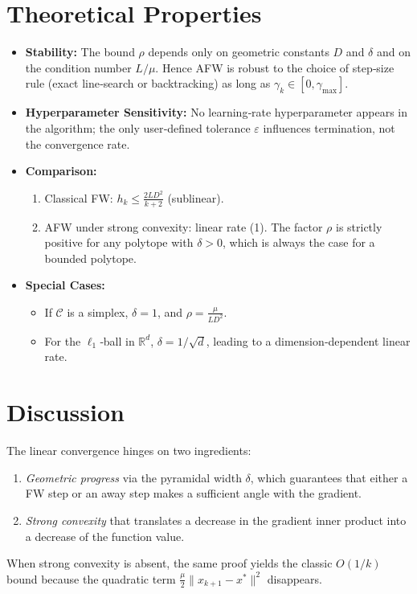 \documentclass{article}
\newcommand{\R}{\mathbb{R}}
\newcommand{\cC}{\mathcal{C}}
\begin{document}
\section*{Theoretical Properties}
\begin{itemize}
\item \textbf{Stability:} The bound $\rho$ depends only on geometric constants $D$ and $\delta$ and on the condition number $L/\mu$. Hence AFW is robust to the choice of step‑size rule (exact line‑search or backtracking) as long as $\gamma_{k}\in[0,\gamma_{\max}]$.
\item \textbf{Hyperparameter Sensitivity:} No learning‑rate hyperparameter appears in the algorithm; the only user‑defined tolerance $\varepsilon$ influences termination, not the convergence rate.
\item \textbf{Comparison:}
    \begin{enumerate}
    \item Classical FW: $h_{k}\le \frac{2LD^{2}}{k+2}$ (sublinear).
    \item AFW under strong convexity: linear rate (1). The factor $\rho$ is strictly positive for any polytope with $\delta>0$, which is always the case for a bounded polytope.
    \end{enumerate}
\item \textbf{Special Cases:}
    \begin{itemize}
    \item If $\cC$ is a simplex, $\delta=1$, and $\rho=\frac{\mu}{L D^{2}}$.
    \item For the $\ell_{1}$‑ball in $\R^{d}$, $\delta = 1/\sqrt{d}$, leading to a dimension‑dependent linear rate.
    \end{itemize}
\end{itemize}

\section*{Discussion}
The linear convergence hinges on two ingredients:
\begin{enumerate}
\item \emph{Geometric progress} via the pyramidal width $\delta$, which guarantees that either a FW step or an away step makes a sufficient angle with the gradient.
\item \emph{Strong convexity} that translates a decrease in the gradient inner product into a decrease of the function value.
\end{enumerate}
When strong convexity is absent, the same proof yields the classic $O(1/k)$ bound because the quadratic term $\frac{\mu}{2}\|x_{k+1}-x^{*}\|^{2}$ disappears.
\end{document}
